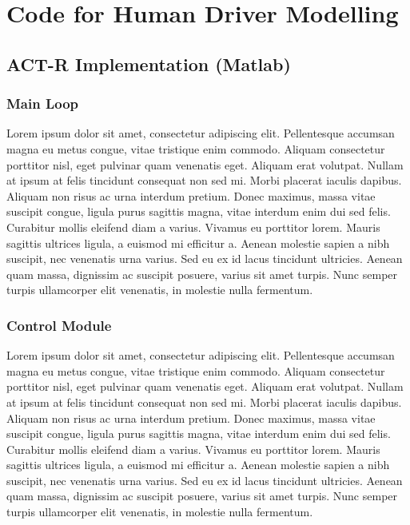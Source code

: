 \chapter{Code for Human Driver Modelling}

\section{ACT-R Implementation (Matlab)}
\label{sec:appendix_cont}

\subsection{Main Loop}

Lorem ipsum dolor sit amet, consectetur adipiscing elit. Pellentesque accumsan magna eu metus congue, vitae tristique enim commodo. Aliquam consectetur porttitor nisl, eget pulvinar quam venenatis eget. Aliquam erat volutpat. Nullam at ipsum at felis tincidunt consequat non sed mi. Morbi placerat iaculis dapibus. Aliquam non risus ac urna interdum pretium. Donec maximus, massa vitae suscipit congue, ligula purus sagittis magna, vitae interdum enim dui sed felis. Curabitur mollis eleifend diam a varius. Vivamus eu porttitor lorem. Mauris sagittis ultrices ligula, a euismod mi efficitur a. Aenean molestie sapien a nibh suscipit, nec venenatis urna varius. Sed eu ex id lacus tincidunt ultricies. Aenean quam massa, dignissim ac suscipit posuere, varius sit amet turpis. Nunc semper turpis ullamcorper elit venenatis, in molestie nulla fermentum.

\subsection{Control Module}

Lorem ipsum dolor sit amet, consectetur adipiscing elit. Pellentesque accumsan magna eu metus congue, vitae tristique enim commodo. Aliquam consectetur porttitor nisl, eget pulvinar quam venenatis eget. Aliquam erat volutpat. Nullam at ipsum at felis tincidunt consequat non sed mi. Morbi placerat iaculis dapibus. Aliquam non risus ac urna interdum pretium. Donec maximus, massa vitae suscipit congue, ligula purus sagittis magna, vitae interdum enim dui sed felis. Curabitur mollis eleifend diam a varius. Vivamus eu porttitor lorem. Mauris sagittis ultrices ligula, a euismod mi efficitur a. Aenean molestie sapien a nibh suscipit, nec venenatis urna varius. Sed eu ex id lacus tincidunt ultricies. Aenean quam massa, dignissim ac suscipit posuere, varius sit amet turpis. Nunc semper turpis ullamcorper elit venenatis, in molestie nulla fermentum.

